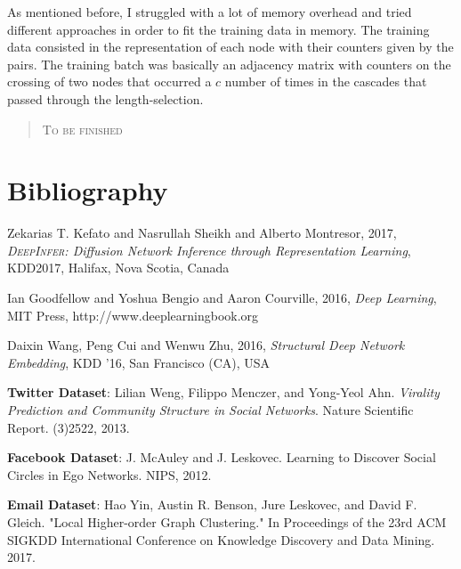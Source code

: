 \documentclass{article}
\begin{document}
			As mentioned before, I struggled with a lot of memory overhead and tried different approaches in order to fit the training data in memory. The training data consisted in the representation of each node with their counters given by the pairs. The training batch was basically an adjacency matrix with counters on the crossing of two nodes that occurred a $c$ number of times in the cascades that passed through the length-selection.
			\begin{quote}
				\centering
				\textsc{To be finished}\\
			\end{quote}
			
			
			\newpage
			
	\section{Bibliography}
	\begin{thebibliography}{10}	
		
		Zekarias T. Kefato and Nasrullah Sheikh and Alberto Montresor, 2017, \textit{\textsc{DeepInfer}: Diffusion Network Inference through Representation Learning}, KDD2017, Halifax, Nova Scotia, Canada
		
		Ian Goodfellow and Yoshua Bengio and Aaron Courville, 2016, \textit{Deep Learning}, MIT Press, http://www.deeplearningbook.org
		
		Daixin Wang, Peng Cui and Wenwu Zhu, 2016, \textit{Structural Deep Network Embedding}, KDD ’16, San Francisco (CA), USA
		
		\textbf{Twitter Dataset}: Lilian Weng, Filippo Menczer, and Yong-Yeol Ahn. \textit{Virality Prediction and Community Structure in Social Networks}. Nature Scientific Report. (3)2522, 2013.
		
		\textbf{Facebook Dataset}: J. McAuley and J. Leskovec. Learning to Discover Social Circles in Ego Networks. NIPS, 2012.
		
		\textbf{Email Dataset}: Hao Yin, Austin R. Benson, Jure Leskovec, and David F. Gleich. "Local Higher-order Graph Clustering." In Proceedings of the 23rd ACM SIGKDD International Conference on Knowledge Discovery and Data Mining. 2017.
		
		
	\end{thebibliography}
			
\end{document}
